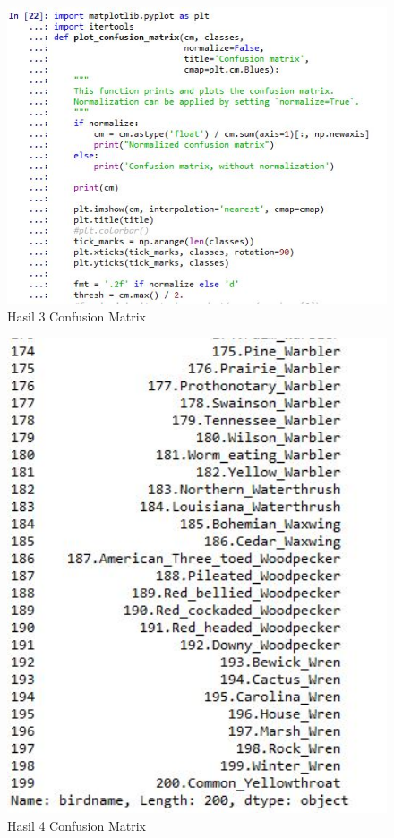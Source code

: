 \begin{figure}[ht]
	\centerline{\includegraphics[width=1\textwidth]{figures/huda/chapter3_praktek/24.JPG}}
	\caption{Hasil 3 Confusion Matrix}
	\label{h28}
\end{figure}

\begin{figure}[ht]
	\centerline{\includegraphics[width=1\textwidth]{figures/huda/chapter3_praktek/25.JPG}}
	\caption{Hasil 4 Confusion Matrix}
	\label{h29}
\end{figure}

